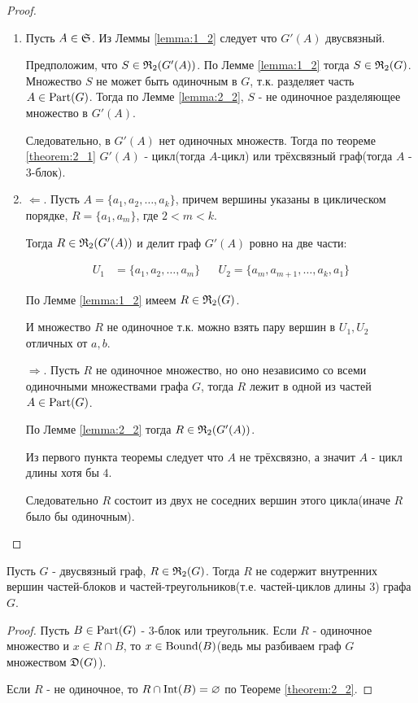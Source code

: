 \begin{proof}
	\begin{enumerate}
		\item Пусть $A \in \S$.
			Из Леммы \ref{lemma:1_2} следует что $G'(A)$ двусвязный.

			Предположим, что $S \in \R_2(G'(A))$.
			По Лемме \ref{lemma:1_2} тогда $S \in \R_2(G)$.
			Множество $S$ не может быть одиночным в $G$, т.к. разделяет часть $A \in \Part(G)$.
			Тогда по Лемме \ref{lemma:2_2}, $S$ - не одиночное разделяющее множество в  $G'(A)$.

			Следовательно, в  $G'(A)$ нет одиночных множеств.
			Тогда по теореме \ref{theorem:2_1} $G'(A)$ - цикл(тогда $A$-цикл) или трёхсвязный граф(тогда $A$ - 3-блок).

		\item $\Longleftarrow$. Пусть  $A = \{ a_1, a_2, \ldots, a_k \}$, причем вершины указаны в циклическом порядке, $R = \{a_1, a_m\}$, где  $2 < m < k$.

			Тогда  $R \in \R_2(G'(A))$ и делит граф  $G'(A)$ ровно на две части:

			\begin{align*}
				U_1 &= \{a_1, a_2, \ldots, a_m\} && U_2 = \{a_m, a_{m+1}, \ldots, a_k, a_1\}
			\end{align*}

			По Лемме \ref{lemma:1_2} имеем $R \in \R_2(G)$.

			И множество $R$ не одиночное т.к. можно взять пару вершин в $U_1, U_2$ отличных от $a, b$.

			$\Longrightarrow$. Пусть $R$ не одиночное множество, но оно независимо со всеми одиночными множествами графа  $G$, тогда $R$ лежит в одной из частей $A \in \Part(G)$.

			По Лемме \ref{lemma:2_2} тогда $R \in \R_2(G'(A))$.

			Из первого пункта теоремы  следует что $A$ не трёхсвязно, а значит $A$ - цикл длины хотя бы $4$.

			Следовательно  $R$ состоит из двух не соседних вершин этого цикла(иначе $R$ было бы одиночным).

	\end{enumerate}
\end{proof}


\begin{crly}[Следствие 2.1] \label{corollary:2_1}
	Пусть $G$ - двусвязный граф, $R \in \R_2(G)$. Тогда $R$ не содержит внутренних вершин частей-блоков и частей-треугольников(т.е. частей-циклов длины 3) графа $G$.
\end{crly}
\begin{proof}
	Пусть $B \in \Part(G)$ - 3-блок или треугольник.
	Если  $R$ - одиночное множество и $x \in R \cap B$, то $x \in \Bound(B)$(ведь мы разбиваем граф $G$ множеством $\D(G)$).
	
	Если  $R$ - не одиночное, то $R \cap \Int(B) = \varnothing$ по Теореме \ref{theorem:2_2}.
\end{proof}


